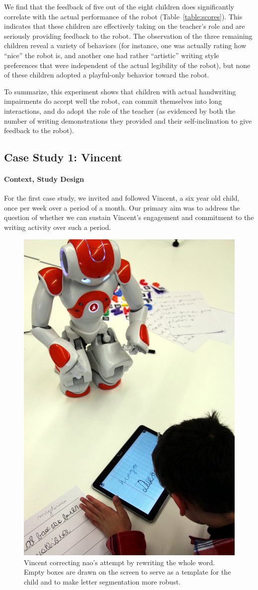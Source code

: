 \documentclass{article}
\begin{document}
We find that the feedback of five out of the eight children does significantly
correlate with the actual performance of the robot (Table~\ref{table:scores}).
This indicates that these children are effectively taking on the teacher's
role and are seriously providing feedback to the robot. The observation of
the three remaining children reveal a variety of behaviors (for instance, one
was actually rating how ``nice'' the robot is, and another one had rather
``artistic'' writing style preferences that were independent of the actual
legibility of the robot), but none of these children adopted a playful-only
behavior toward the robot.

To summarize, this experiment shows that children with actual handwriting
impairments do accept well the robot, can commit themselves into long
interactions, and do adopt the role of the teacher (as evidenced by both the
number of writing demonstrations they provided and their self-inclination to
give feedback to the robot).

\subsection{Case Study 1: Vincent}
\label{vincent}

\paragraph{Context, Study Design}

For the first case study, we invited and followed Vincent, a six year old
child, once per week over a period of a month. Our primary aim was to address
the question of whether we can sustain Vincent's engagement and commitment to
the writing activity over such a period.

\begin{figure}
    \centering
    \includegraphics[width=0.5\linewidth]{diego}
    \caption{\small Vincent correcting {\sc nao}'s attempt by rewriting the
        whole word. Empty boxes are drawn on the screen to serve as a template for the child
        and to make letter segmentation more robust.}
    \label{fig:diego}
\end{figure}
\end{document}
